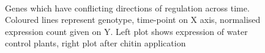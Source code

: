 \documentclass[../main.tex]{subfiles}
\begin{document}
\begin{figure}[!ht]
  \centering
  \\
  \caption{Genes which have conflicting directions of regulation across time.
    Coloured lines represent genotype, time-point on X axis, normalised
    expression count given on Y. Left plot shows expression of water control
    plants, right plot after chitin application}
  \label{fig:interestinggenes}
\end{figure}
\end{document}
